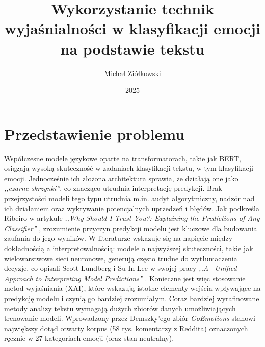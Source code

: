 \documentclass[wmii, inf, mgr]{uwmthesis}
\date{2025}
\title{Wykorzystanie technik wyjaśnialności w klasyfikacji emocji na podstawie tekstu}
\author{Michał Ziółkowski}
\begin{document}
\renewcommand{\refname}{Bibliografia}
\renewcommand{\bibname}{Bibliografia}

\maketitle

\tableofcontents




\chapter*{Przedstawienie problemu}
Współczesne modele językowe oparte na transformatorach, takie jak BERT, osiągają wysoką skuteczność w zadaniach klasyfikacji tekstu, w tym klasyfikacji emocji. Jednocześnie ich złożona architektura sprawia, że działają one jako \textit{,,czarne skrzynki''}, co znacząco utrudnia interpretację predykcji. Brak przejrzystości modeli tego typu utrudnia m.in. audyt algorytmiczny, nadzór nad ich działaniem oraz wykrywanie potencjalnych uprzedzeń i błędów. Jak podkreśla Ribeiro w artykule \textit{,,Why Should I Trust You?: Explaining the Predictions of Any Classifier''} \cite{tulio2016}, zrozumienie przyczyn predykcji modelu jest kluczowe dla budowania zaufania do jego wyników. W literaturze wskazuje się na napięcie między dokładnością a interpretowalnością: modele o najwyższej skuteczności, takie jak wielowarstwowe sieci neuronowe, generują często trudne do wytłumaczenia decyzje, co opisali Scott Lundberg i Su-In Lee w swojej pracy \textit{,,A~ Unified Approach to Interpreting Model Predictions''} \cite{SHAPlundberg}. Konieczne jest więc stosowanie metod wyjaśniania (XAI), które wskazują istotne elementy wejścia wpływające na predykcję modelu i czynią go bardziej zrozumiałym. Coraz bardziej wyrafinowane metody analizy tekstu wymagają dużych zbiorów danych umożliwiających trenowanie modeli. Wprowadzony przez Demszky’ego zbiór \textit{GoEmotions} stanowi największy dotąd otwarty korpus (58 tys. komentarzy z Reddita) oznaczonych ręcznie w 27 kategoriach emocji (oraz stan neutralny).
\end{document}
